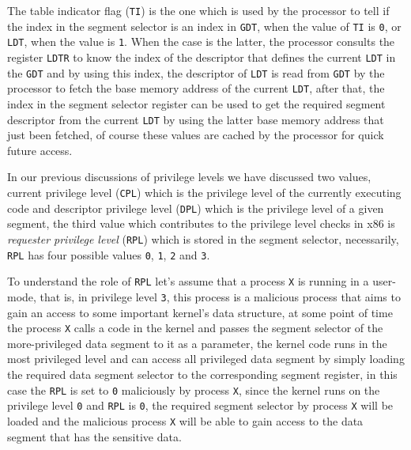The table indicator flag (\lstinline!TI!) is the one which is used by
the processor to tell if the index in the segment selector is an index
in \lstinline!GDT!, when the value of \lstinline!TI! is \lstinline!0!,
or \lstinline!LDT!, when the value is \lstinline!1!. When the case is
the latter, the processor consults the register \lstinline!LDTR! to know
the index of the descriptor that defines the current \lstinline!LDT! in
the \lstinline!GDT! and by using this index, the descriptor of
\lstinline!LDT! is read from \lstinline!GDT! by the processor to fetch
the base memory address of the current \lstinline!LDT!, after that, the
index in the segment selector register can be used to get the required
segment descriptor from the current \lstinline!LDT! by using the latter
base memory address that just been fetched, of course these values are
cached by the processor for quick future access.

In our previous discussions of privilege levels we have discussed two
values, current privilege level (\lstinline!CPL!) which is the privilege
level of the currently executing code and descriptor privilege level
(\lstinline!DPL!) which is the privilege level of a given segment, the
third value which contributes to the privilege level checks in x86 is
\emph{requester privilege level} (\lstinline!RPL!) which is stored in
the segment selector, necessarily, \lstinline!RPL! has four possible
values \lstinline!0!, \lstinline!1!, \lstinline!2! and \lstinline!3!.

To understand the role of \lstinline!RPL! let's assume that a process
\lstinline!X! is running in a user-mode, that is, in privilege level
\lstinline!3!, this process is a malicious process that aims to gain an
access to some important kernel's data structure, at some point of time
the process \lstinline!X! calls a code in the kernel and passes the
segment selector of the more-privileged data segment to it as a
parameter, the kernel code runs in the most privileged level and can
access all privileged data segment by simply loading the required data
segment selector to the corresponding segment register, in this case the
\lstinline!RPL! is set to \lstinline!0! maliciously by process
\lstinline!X!, since the kernel runs on the privilege level
\lstinline!0! and \lstinline!RPL! is \lstinline!0!, the required segment
selector by process \lstinline!X! will be loaded and the malicious
process \lstinline!X! will be able to gain access to the data segment
that has the sensitive data.


